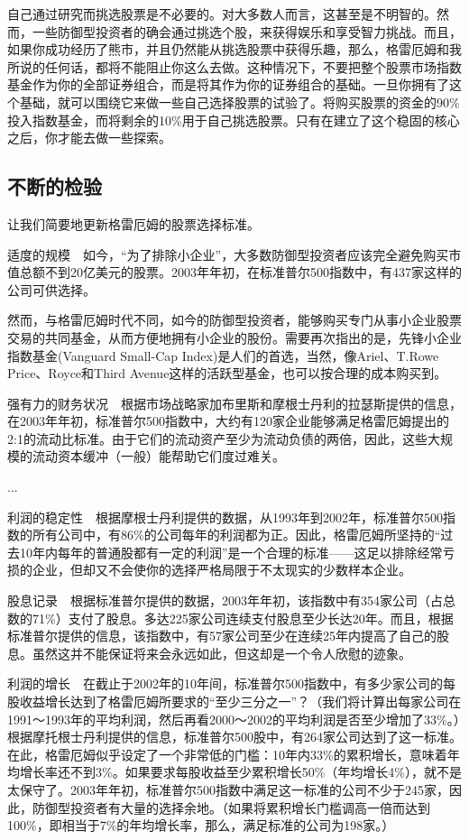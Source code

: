 \documentclass[12pt,oneside]{book}
\begin{document}
自己通过研究而挑选股票是不必要的。对大多数人而言，这甚至是不明智的。然而，一些防御型投资者的确会通过挑选个股，来获得娱乐和享受智力挑战。而且，如果你成功经历了熊市，并且仍然能从挑选股票中获得乐趣，那么，格雷厄姆和我所说的任何话，都将不能阻止你这么去做。这种情况下，不要把整个股票市场指数基金作为你的全部证券组合，而是将其作为你的证券组合的基础。一旦你拥有了这个基础，就可以围绕它来做一些自己选择股票的试验了。将购买股票的资金的90\%投入指数基金，而将剩余的10\%用于自己挑选股票。只有在建立了这个稳固的核心之后，你才能去做一些探索。


\subsection{不断的检验}
让我们简要地更新格雷厄姆的股票选择标准。

适度的规模　如今，“为了排除小企业”，大多数防御型投资者应该完全避免购买市值总额不到20亿美元的股票。2003年年初，在标准普尔500指数中，有437家这样的公司可供选择。

然而，与格雷厄姆时代不同，如今的防御型投资者，能够购买专门从事小企业股票交易的共同基金，从而方便地拥有小企业的股份。需要再次指出的是，先锋小企业指数基金(Vanguard Small-Cap Index)是人们的首选，当然，像Ariel、T.Rowe Price、Royce和Third Avenue这样的活跃型基金，也可以按合理的成本购买到。

强有力的财务状况　根据市场战略家加布里斯和摩根士丹利的拉瑟斯提供的信息，在2003年年初，标准普尔500指数中，大约有120家企业能够满足格雷厄姆提出的2:1的流动比标准。由于它们的流动资产至少为流动负债的两倍，因此，这些大规模的流动资本缓冲（一般）能帮助它们度过难关。

...

利润的稳定性　根据摩根士丹利提供的数据，从1993年到2002年，标准普尔500指数的所有公司中，有86\%的公司每年的利润都为正。因此，格雷厄姆所坚持的“过去10年内每年的普通股都有一定的利润”是一个合理的标准——这足以排除经常亏损的企业，但却又不会使你的选择严格局限于不太现实的少数样本企业。

股息记录　根据标准普尔提供的数据，2003年年初，该指数中有354家公司（占总数的71\%）支付了股息。多达225家公司连续支付股息至少长达20年。而且，根据标准普尔提供的信息，该指数中，有57家公司至少在连续25年内提高了自己的股息。虽然这并不能保证将来会永远如此，但这却是一个令人欣慰的迹象。

利润的增长　在截止于2002年的10年间，标准普尔500指数中，有多少家公司的每股收益增长达到了格雷厄姆所要求的“至少三分之一”？（我们将计算出每家公司在1991～1993年的平均利润，然后再看2000～2002的平均利润是否至少增加了33\%。）根据摩托根士丹利提供的信息，标准普尔500股中，有264家公司达到了这一标准。在此，格雷厄姆似乎设定了一个非常低的门槛：10年内33\%的累积增长，意味着年均增长率还不到3\%。如果要求每股收益至少累积增长50\%（年均增长4\%），就不是太保守了。2003年年初，标准普尔500指数中满足这一标准的公司不少于245家，因此，防御型投资者有大量的选择余地。（如果将累积增长门槛调高一倍而达到100\%，即相当于7\%的年均增长率，那么，满足标准的公司为198家。）
\end{document}
